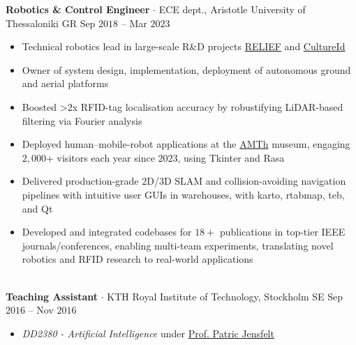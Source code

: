 \documentclass[a4paper,10pt,twoside]{article}
\newcommand{\verticalspacebetweensections}{\vspace{0em}}
\newcommand{\verticalspaceafteritem}{\vspace{-0.8em}}
\begin{document}
  \noindent\textbf{Robotics \& Control Engineer} $\cdot$ ECE dept., Aristotle University of Thessaloniki GR \hfill {\small \textcolor{datecolour}{Sep $2018$ -- Mar $2023$}} \\
  \begin{minipage}[t]{\textwidth}
    \begin{itemize}
      \item Technical robotics lead in large-scale R\&D projects \href{https://relief.web.auth.gr/language/en/home/}{RELIEF} and \href{https://cultureid.web.auth.gr/?page\_id=200&lang=en}{CultureId} \verticalspaceafteritem
      \item Owner of system design, implementation, deployment of autonomous ground and aerial platforms \verticalspaceafteritem
      \item Boosted >$2$x RFID-tag localisation accuracy by robustifying LiDAR-based filtering via Fourier analysis\verticalspaceafteritem
      \item Deployed human--mobile-robot applications at the \href{https://www.amth.gr/en}{AMTh} museum, engaging $2,000$+ visitors each year since $2023$, using Tkinter and Rasa \verticalspaceafteritem
      \item Delivered production-grade 2D/3D SLAM and collision-avoiding navigation pipelines with intuitive user GUIs in warehouses, with karto, rtabmap, teb, and Qt\verticalspaceafteritem
      \item Developed and integrated codebases for $18+$ publications in top-tier IEEE journals/conferences, enabling multi-team experiments, translating novel robotics and RFID research to real-world applications
    \end{itemize}
  \end{minipage} \\[0.2em]

  \noindent\textbf{Teaching Assistant} $\cdot$ KTH Royal Institute of Technology, Stockholm SE \hfill {\small \textcolor{datecolour}{Sep $2016$ -- Nov $2016$}} \\
  \begin{minipage}[t]{\textwidth}
    \begin{itemize}
      \item \textit{DD2380 - Artificial Intelligence} under \href{https://www.kth.se/profile/patric}{Prof. Patric Jensfelt}
    \end{itemize}
  \end{minipage} \\[-1em]
\verticalspacebetweensections
\end{document}

